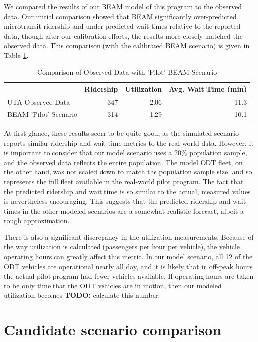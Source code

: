 \documentclass[
]{report}
\begin{document}
We compared the results of our BEAM model of this program to the observed data. Our initial comparison showed that BEAM significantly over-predicted microtransit ridership and under-predicted wait times relative to the reported data, though after our calibration efforts, the results more closely matched the observed data. This comparison (with the calibrated BEAM scenario) is given in Table \ref{tab:existing-comparison}.

\begin{table}

\caption{\label{tab:existing-comparison}Comparison of Observed Data with 'Pilot' BEAM Scenario}
\centering
\begin{tabular}[t]{lrrr}
\toprule
  & Ridership & Utilization & Avg. Wait Time (min)\\
\midrule
UTA Observed Data & 347 & 2.06 & 11.3\\
BEAM 'Pilot' Scenario & 314 & 1.29 & 10.1\\
\bottomrule
\end{tabular}
\end{table}

At first glance, these results seem to be quite good, as the simulated scenario reports similar ridership and wait time metrics to the real-world data. However, it is important to consider that our model scenario uses a 20\% population sample, and the observed data reflects the entire population. The model ODT fleet, on the other hand, was not scaled down to match the population sample size, and so represents the full fleet available in the real-world pilot program. The fact that the predicted ridership and wait time is so similar to the actual, measured values is nevertheless encouraging. This suggests that the predicted ridership and wait times in the other modeled scenarios are a somewhat realistic forecast, albeit a rough approximation.

There is also a significant discrepancy in the utilization measurements. Because of the way utilization is calculated (passengers per hour per vehicle), the vehicle operating hours can greatly affect this metric. In our model scenario, all 12 of the ODT vehicles are operational nearly all day, and it is likely that in off-peak hours the actual pilot program had fewer vehicles available. If operating hours are taken to be only time that the ODT vehicles are in motion, then our modeled utilization becomes \textbf{TODO:} calculate this number.

\hypertarget{candidate-scenario-comparison}{%
\section{Candidate scenario comparison}\label{candidate-scenario-comparison}}
\end{document}
